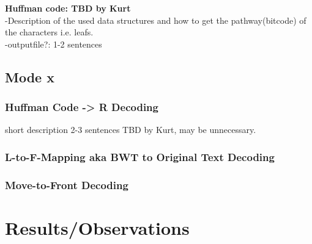 \documentclass[11pt, notitlepage]{scrartcl}
\begin{document}
\textbf{Huffman code: TBD by Kurt}\\
-Description of the used data structures and how to get the pathway(bitcode) of the characters i.e. leafs.\\
-outputfile?: 1-2 sentences

\subsection{Mode x}
\subsubsection{Huffman Code -> R Decoding}
short description 2-3 sentences TBD by Kurt, may be unnecessary.
\subsubsection{L-to-F-Mapping aka BWT to Original Text Decoding}
\subsubsection{Move-to-Front Decoding}

\section{Results/Observations}
\end{document}

